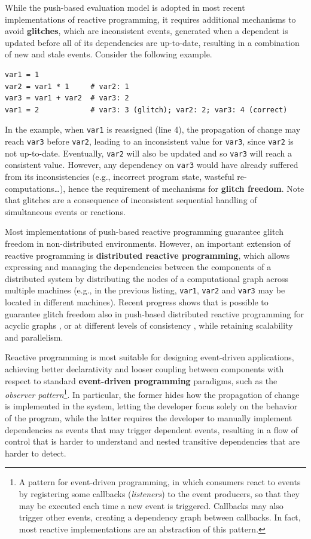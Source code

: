 While the push-based evaluation model is adopted in most recent implementations
of reactive programming, it requires additional mechanisms to avoid
\textbf{glitches}, which are inconsistent events, generated when a dependent is
updated before all of its dependencies are up-to-date, resulting in a
combination of new and stale events. Consider the following example.

\begin{lstlisting}
var1 = 1
var2 = var1 * 1     # var2: 1
var3 = var1 + var2  # var3: 2
var1 = 2            # var3: 3 (glitch); var2: 2; var3: 4 (correct)
\end{lstlisting}

In the example, when \texttt{var1} is reassigned (line 4), the propagation of
change may reach \texttt{var3} before \texttt{var2}, leading to an inconsistent
value for \texttt{var3}, since \texttt{var2} is not up-to-date. Eventually,
\texttt{var2} will also be updated and so \texttt{var3} will reach a consistent
value. However, any dependency on \texttt{var3} would have already suffered
from its inconsistencies (e.g., incorrect program state, wasteful
re-computations\dots), hence the requirement of mechanisms for \textbf{glitch
freedom}. Note that glitches are a consequence of inconsistent sequential
handling of simultaneous events or reactions.

Most implementations of push-based reactive programming guarantee glitch
freedom in non-distributed environments. However, an important extension of
reactive programming is \textbf{distributed reactive programming}, which allows
expressing and managing the dependencies between the components of a
distributed system by distributing the nodes of a computational graph across
multiple machines (e.g., in the previous listing, \texttt{var1}, \texttt{var2}
and \texttt{var3} may be located in different machines). Recent progress shows
that is possible to guarantee glitch freedom also in push-based distributed
reactive programming for acyclic graphs \cite{QPROP}, or at different levels of
consistency \cite{DREAM}, while retaining scalability and parallelism.

Reactive programming is most suitable for designing event-driven applications,
achieving better declarativity and looser coupling between components with
respect to standard \textbf{event-driven programming} paradigms, such as the
\textit{observer pattern}\footnote{A pattern for event-driven programming, in
which consumers react to events by registering some callbacks
(\textit{listeners}) to the event producers, so that they may be executed each
time a new event is triggered. Callbacks may also trigger other events,
creating a dependency graph between callbacks. In fact, most reactive
implementations are an abstraction of this pattern.}. In particular, the former
hides how the propagation of change is implemented in the system, letting the
developer focus solely on the behavior of the program, while the latter
requires the developer to manually implement dependencies as events that may
trigger dependent events, resulting in a flow of control that is harder to
understand and nested transitive dependencies that are harder to detect.
